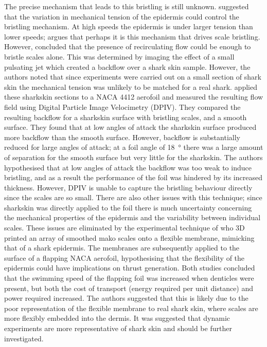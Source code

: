 \documentclass[12pt,oneside,a4paper]{article}
\begin{document}
The precise mechanism that leads to this bristling is still unknown. \cite{bechert1985} suggested that the variation in mechanical tension of the epidermis could control the bristling mechanism. At high speeds the epidermis is under larger tension than lower speeds; \cite{bechert1985} argues that perhaps it is this mechanism that drives scale bristling. However, \cite{lang2014} concluded that the presence of recirculating flow could be enough to bristle scales alone. This was determined by imaging the effect of a small pulsating jet which created a backflow over a shark skin sample. However, the authors noted that since experiments were carried out on a small section of shark skin the mechanical tension was unlikely to be matched for a real shark. \cite{lang2014} applied these sharkskin sections to a NACA 4412 aerofoil and measured the resulting flow field using Digital Particle Image Velocimetry (DPIV). They compared the resulting backflow for a sharkskin surface with bristling scales, and a smooth surface. They found that at low angles of attack the sharkskin surface produced more backflow than the smooth surface. However, backflow is substantially reduced for large angles of attack; at a foil angle of \SI{18}{\degree} there was a large amount of separation for the smooth surface but very little for the sharkskin. The authors hypothesised that at low angles of attack the backflow was too weak to induce bristling, and as a result the performance of the foil was hindered by its increased thickness. However, DPIV is unable to capture the bristling behaviour directly since the scales are so small. There are also other issues with this technique; since sharkskin was directly applied to the foil there is much uncertainty concerning the mechanical properties of the epidermis and the variability between individual scales. These issues are eliminated by the experimental technique of \cite{wen2014,wen2015} who 3D printed an array of smoothed mako scales onto a flexible membrane, mimicking that of a shark epidermis. The membranes are subsequently applied to the surface of a flapping NACA aerofoil, hypothesising that the flexibility of the epidermis could have implications on thrust generation. Both studies concluded that the swimming speed of the flapping foil was increased when denticles were present, but both the cost of transport (energy required per unit distance) and power required increased. The authors suggested that this is likely due to the poor representation of the flexible membrane to real shark skin, where scales are more flexibly embedded into the dermis. It was suggested that dynamic experiments are more representative of shark skin and should be further investigated.
\end{document}
